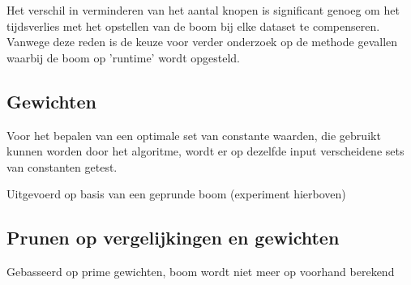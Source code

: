 \documentclass[Main.tex]{subfiles}
\begin{document}
Het verschil in verminderen van het aantal knopen is significant genoeg om het tijdsverlies met het opstellen van de boom bij elke dataset te compenseren. Vanwege deze reden is de keuze voor verder onderzoek op de methode gevallen waarbij de boom op 'runtime' wordt opgesteld. 

\subsection{Gewichten}
Voor het bepalen van een optimale set van constante waarden, die gebruikt kunnen worden door het algoritme, wordt er op dezelfde input verscheidene sets van constanten getest. 


Uitgevoerd op basis van een geprunde boom (experiment hierboven)
\subsection{Prunen op vergelijkingen en gewichten}
Gebasseerd op prime gewichten, boom wordt niet meer op voorhand berekend
\end{document}
